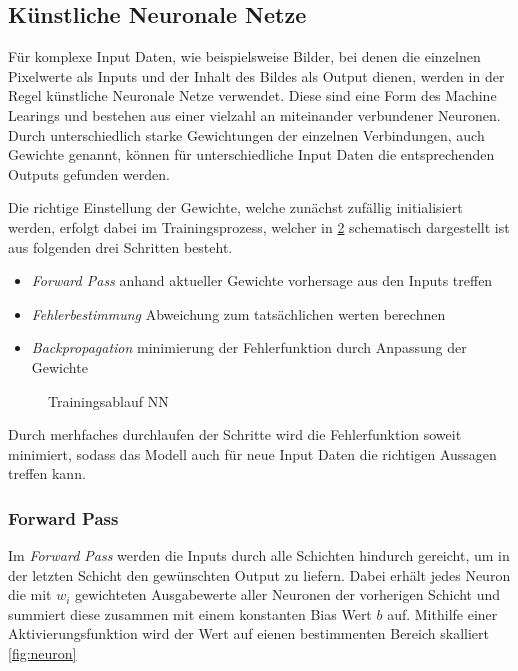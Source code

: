 
\subsection{Künstliche Neuronale Netze} \label{subsec:nn}

Für komplexe Input Daten, wie beispielsweise Bilder, bei denen 
die einzelnen Pixelwerte als Inputs und der Inhalt des Bildes als 
Output dienen, werden in der Regel künstliche Neuronale Netze verwendet.
Diese sind eine Form des Machine Learings und bestehen aus einer 
vielzahl an miteinander verbundener Neuronen. Durch unterschiedlich 
starke Gewichtungen der einzelnen Verbindungen, auch Gewichte genannt, 
können für unterschiedliche Input Daten die entsprechenden Outputs 
gefunden werden.

\begin{figure}[htb]
    \centering
    \label{fig:nn}
    \def\svgwidth{0.5\columnwidth}
    \footnotesize
    
\end{figure}


Die richtige Einstellung der Gewichte, welche zunächst zufällig initialisiert werden, 
erfolgt dabei im Trainingsprozess, welcher in \ref{fig:train} schematisch
 dargestellt ist aus folgenden drei Schritten besteht.

\begin{itemize}
    \item \textit{Forward Pass} anhand aktueller Gewichte vorhersage aus den Inputs treffen
    \item \textit{Fehlerbestimmung} Abweichung zum tatsächlichen werten berechnen
    \item \textit{Backpropagation} minimierung der Fehlerfunktion durch Anpassung der Gewichte
\end{itemize}

\begin{figure}[htb]
    \centering
    \label{fig:train}
    \def\svgwidth{0.5\columnwidth}
    
    \caption{Trainingsablauf NN}
\end{figure}

Durch merhfaches durchlaufen der Schritte wird die Fehlerfunktion soweit minimiert, 
sodass das Modell auch für neue Input Daten die richtigen Aussagen treffen kann.


\subsubsection{Forward Pass}
Im \textit{Forward Pass} werden die Inputs durch alle Schichten hindurch 
gereicht, um in der letzten Schicht den gewünschten Output zu liefern.
Dabei erhält jedes Neuron die mit $w_{i}$ gewichteten Ausgabewerte aller
Neuronen der vorherigen Schicht und summiert diese zusammen mit einem konstanten 
Bias Wert $b$ auf. 
Mithilfe einer Aktivierungsfunktion wird der Wert auf eienen bestimmenten Bereich 
skalliert \ref{fig:neuron}


